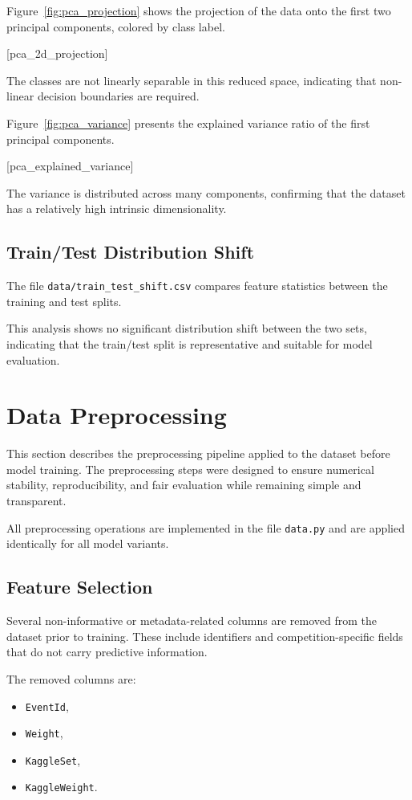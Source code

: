 \documentclass[12pt,a4paper]{article}
\begin{document}
Figure~\ref{fig:pca_projection} shows the projection of the data onto the first
two principal components, colored by class label.

[pca_2d_projection]

The classes are not linearly separable in this reduced space, indicating that
non-linear decision boundaries are required.

Figure~\ref{fig:pca_variance} presents the explained variance ratio of the first
principal components.

[pca_explained_variance]

The variance is distributed across many components, confirming that the dataset
has a relatively high intrinsic dimensionality.

\subsection{Train/Test Distribution Shift}

The file \texttt{data/train\_test\_shift.csv} compares feature statistics between the
training and test splits.

This analysis shows no significant distribution shift between the two sets,
indicating that the train/test split is representative and suitable for model
evaluation.

\section{Data Preprocessing}

This section describes the preprocessing pipeline applied to the dataset before
model training. The preprocessing steps were designed to ensure numerical
stability, reproducibility, and fair evaluation while remaining simple and
transparent.

All preprocessing operations are implemented in the file \texttt{data.py} and
are applied identically for all model variants.

\subsection{Feature Selection}

Several non-informative or metadata-related columns are removed from the dataset
prior to training. These include identifiers and competition-specific fields that
do not carry predictive information.

The removed columns are:
\begin{itemize}
    \item \texttt{EventId},
    \item \texttt{Weight},
    \item \texttt{KaggleSet},
    \item \texttt{KaggleWeight}.
\end{itemize}
\end{document}
